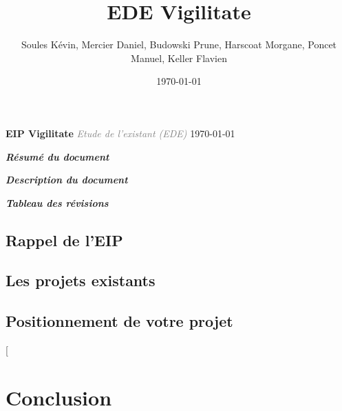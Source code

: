 \documentclass[a4paper,11pt]{report}
\title{EDE Vigilitate}
\author{Soules Kévin, Mercier Daniel, Budowski Prune, Harscoat Morgane, Poncet Manuel, Keller Flavien}
\date{\today}
\begin{document}

\begin{center}\textcolor{myBlue}{\Huge \textbf{EIP Vigilitate}}\linebreak
\thispagestyle{empty}
\textcolor{gray}{\textit{\Large Etude de l'existant (EDE)}}\linebreak
{}
{\today}\end{center}
\newpage
{}
\begin{flushleft}\textcolor{myBlue}{\textit{\large \textbf{Résumé du document}}} \linebreak \end{flushleft}


\newpage
\begin{flushleft}
\textcolor{myBlue}{\textit{\large \textbf{Description du document}}} 
\bigbreak

\bigbreak
\bigbreak
\textcolor{myBlue}{\textit{\large \textbf{Tableau des révisions}}}
\bigbreak


\end{flushleft}
\tableofcontents
\thispagestyle{fancy}

\textcolor{myBlue}{\chapter{Rappel de l'EIP}}



\textcolor{myBlue}{\chapter{Les projets existants}}

 \newpage
 \newpage
 \newpage
 \newpage


\textcolor{myBlue}{\chapter{Positionnement de votre projet}}

\textcolor{myBlue}{[\chapter{Conclusion}}


\end{document}
